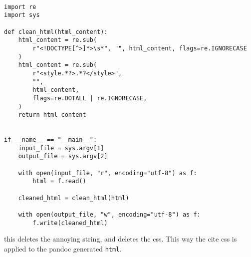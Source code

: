 \documentclass[11pt]{article}
\begin{document}
\begin{verbatim}

import re
import sys

def clean_html(html_content):
    html_content = re.sub(
        r"<!DOCTYPE[^>]*>\s*", "", html_content, flags=re.IGNORECASE
    )
    html_content = re.sub(
        r"<style.*?>.*?</style>",
        "",
        html_content,
        flags=re.DOTALL | re.IGNORECASE,
    )
    return html_content


if __name__ == "__main__":
    input_file = sys.argv[1]
    output_file = sys.argv[2]

    with open(input_file, "r", encoding="utf-8") as f:
        html = f.read()

    cleaned_html = clean_html(html)

    with open(output_file, "w", encoding="utf-8") as f:
        f.write(cleaned_html)

\end{verbatim}
this deletes the annoying string, and deletes the css. This way the cite css is applied to the pandoc generated \texttt{html}.
\end{document}
